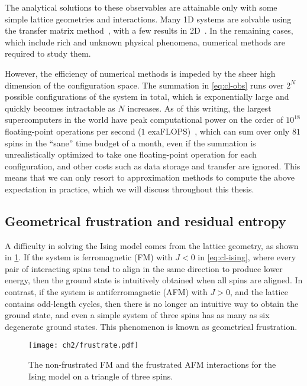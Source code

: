 The analytical solutions to these observables are attainable only with some simple lattice geometries and interactions. Many 1D systems are solvable using the transfer matrix method~\cite{chaikin1995principles5}, with a few results in 2D~\cite{baxter1995solvable, march2016exactly, caravelli2022some}. In the remaining cases, which include rich and unknown physical phenomena, numerical methods are required to study them.

However, the efficiency of numerical methods is impeded by the sheer high dimension of the configuration space. The summation in \cref{eq:cl-obs} runs over $2^N$ possible configurations of the system in total, which is exponentially large and quickly becomes intractable as $N$ increases. As of this writing, the largest supercomputers in the world have peak computational power on the order of $10^{18}$ floating-point operations per second ($1$ exaFLOPS)~\cite{kogge2022frontier}, which can sum over only $81$ spins in the ``sane'' time budget of a month, even if the summation is unrealistically optimized to take one floating-point operation for each configuration, and other costs such as data storage and transfer are ignored. This means that we can only resort to approximation methods to compute the above expectation in practice, which we will discuss throughout this thesis.

\subsection{Geometrical frustration and residual entropy}
\label{sec:frustrate}

A difficulty in solving the Ising model comes from the lattice geometry, as shown in \cref{fig:frustrate}. If the system is ferromagnetic (FM) with $J < 0$ in \cref{eq:cl-ising}, where every pair of interacting spins tend to align in the same direction to produce lower energy, then the ground state is intuitively obtained when all spins are aligned. In contrast, if the system is antiferromagnetic (AFM) with $J > 0$, and the lattice contains odd-length cycles, then there is no longer an intuitive way to obtain the ground state, and even a simple system of three spins has as many as six degenerate ground states. This phenomenon is known as geometrical frustration.

\begin{figure}[htb]
\centering
\texttt{[image: ch2/frustrate.pdf]}
\caption[Frustrated interactions in Ising model]{
The non-frustrated FM and the frustrated AFM interactions for the Ising model on a triangle of three spins.
}
\label{fig:frustrate}
\end{figure}

